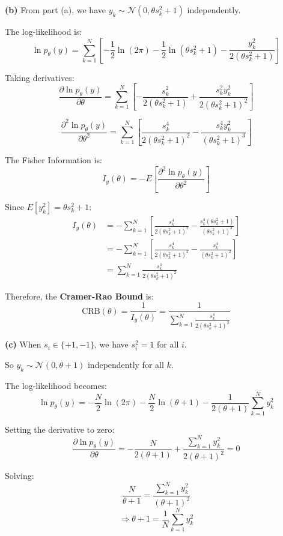 \documentclass[12pt,a4paper,onecolumn]{exam}
\begin{document}
\begin{solution}
\textbf{(b)} From part (a), we have $y_k \sim \mathcal{N}(0, \theta s_k^2 + 1)$ independently.

The log-likelihood is:
\[
\ln p_{\theta}(y) = \sum_{k=1}^{N} \left[-\frac{1}{2}\ln(2\pi) - \frac{1}{2}\ln(\theta s_k^2 + 1) - \frac{y_k^2}{2(\theta s_k^2 + 1)}\right]
\]

Taking derivatives:
\[
\frac{\partial \ln p_{\theta}(y)}{\partial \theta} = \sum_{k=1}^{N} \left[-\frac{s_k^2}{2(\theta s_k^2 + 1)} + \frac{s_k^2 y_k^2}{2(\theta s_k^2 + 1)^2}\right]
\]

\[
\frac{\partial^2 \ln p_{\theta}(y)}{\partial \theta^2} = \sum_{k=1}^{N} \left[\frac{s_k^4}{2(\theta s_k^2 + 1)^2} - \frac{s_k^4 y_k^2}{(\theta s_k^2 + 1)^3}\right]
\]

The Fisher Information is:
\[
I_y(\theta) = -E\left[\frac{\partial^2 \ln p_{\theta}(y)}{\partial \theta^2}\right]
\]

Since $E[y_k^2] = \theta s_k^2 + 1$:
\begin{align*}
I_y(\theta) &= -\sum_{k=1}^{N} \left[\frac{s_k^4}{2(\theta s_k^2 + 1)^2} - \frac{s_k^4(\theta s_k^2 + 1)}{(\theta s_k^2 + 1)^3}\right] \\
&= -\sum_{k=1}^{N} \left[\frac{s_k^4}{2(\theta s_k^2 + 1)^2} - \frac{s_k^4}{(\theta s_k^2 + 1)^2}\right] \\
&= \sum_{k=1}^{N} \frac{s_k^4}{2(\theta s_k^2 + 1)^2}
\end{align*}

Therefore, the \textbf{Cramer-Rao Bound} is:
\[
\boxed{\text{CRB}(\theta) = \frac{1}{I_y(\theta)} = \frac{1}{\sum_{k=1}^{N} \frac{s_k^4}{2(\theta s_k^2 + 1)^2}}}
\]

\vspace{1em}
\textbf{(c)} When $s_i \in \{+1, -1\}$, we have $s_i^2 = 1$ for all $i$.

So $y_k \sim \mathcal{N}(0, \theta + 1)$ independently for all $k$.

The log-likelihood becomes:
\[
\ln p_{\theta}(y) = -\frac{N}{2}\ln(2\pi) - \frac{N}{2}\ln(\theta + 1) - \frac{1}{2(\theta + 1)}\sum_{k=1}^{N} y_k^2
\]

Setting the derivative to zero:
\[
\frac{\partial \ln p_{\theta}(y)}{\partial \theta} = -\frac{N}{2(\theta + 1)} + \frac{\sum_{k=1}^{N} y_k^2}{2(\theta + 1)^2} = 0
\]

Solving:
\[
\frac{N}{\theta + 1} = \frac{\sum_{k=1}^{N} y_k^2}{(\theta + 1)^2}
\]
\[
\Rightarrow \theta + 1 = \frac{1}{N}\sum_{k=1}^{N} y_k^2
\]


\end{solution}
\end{document}

